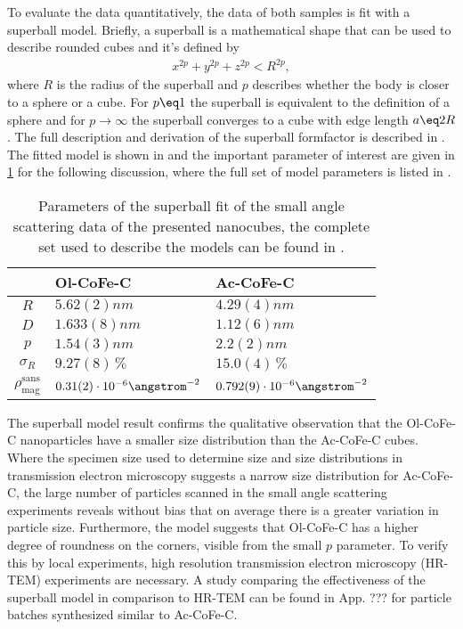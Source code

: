 \documentclass[\main/dresen_thesis.tex]{subfiles}
\begin{document}
    To evaluate the data quantitatively, the data of both samples is fit with a superball model.
    Briefly, a superball is a mathematical shape that can be used to describe rounded cubes and it's defined by
    \begin{align}
      x^{2p} + y^{2p} + z^{2p} < R^{2p},
    \end{align}
    where $R$ is the radius of the superball and $p$ describes whether the body is closer to a sphere or a cube.
    For $p\eq1$ the superball is equivalent to the definition of a sphere and for $p \rightarrow \infty$ the superball converges to a cube with edge length $a \eq 2R$.
    The full description and derivation of the superball formfactor is described in .
    The fitted model is shown in  and the important parameter of interest are given in \ref{tab:monolayers:nanoparticle:sas} for the following discussion, where the full set of model parameters is listed in .
    \begin{table}[h]
      \centering
      \caption{\label{tab:monolayers:nanoparticle:sas}Parameters of the superball fit of the small angle scattering data of the presented nanocubes, the complete set used to describe the models can be found in .}
      \begin{tabular}{ c | l | l }
          & Ol-CoFe-C & Ac-CoFe-C \\
        \hline
        $R$
          & $5.62(2) \unit{nm}$
          & $4.29(4) \unit{nm}$\\
        $D$
          & $1.633(8) \unit{nm}$
          & $1.12(6) \unit{nm}$\\
        $p$
          & $1.54(3) \unit{nm}$
          & $2.2(2) \unit{nm}$\\
        $\sigma_R$
          & $9.27(8) \,\%$
          & $15.0(4) \,\%$\\
        $\rho_\mathrm{mag}^\mathrm{sans}$
          & $0.31(2) \cdot 10^{-6} \angstrom^{-2}$
          & $0.792(9) \cdot 10^{-6} \angstrom^{-2}$\\
        \hline
      \end{tabular}
    \end{table}
    The superball model result confirms the qualitative observation that the Ol-CoFe-C nanoparticles have a smaller size distribution than the Ac-CoFe-C cubes.
    Where the specimen size used to determine size and size distributions in transmission electron microscopy suggests a narrow size distribution for Ac-CoFe-C, the large number of particles scanned in the small angle scattering experiments reveals without bias that on average there is a greater variation in particle size.
    Furthermore, the model suggests that Ol-CoFe-C has a higher degree of roundness on the corners, visible from the small $p$ parameter.
    To verify this by local experiments, high resolution transmission electron microscopy (HR-TEM) experiments are necessary.
    A study comparing the effectiveness of the superball model in comparison to HR-TEM can be found in App. ??? for particle batches synthesized similar to Ac-CoFe-C.
\end{document}

